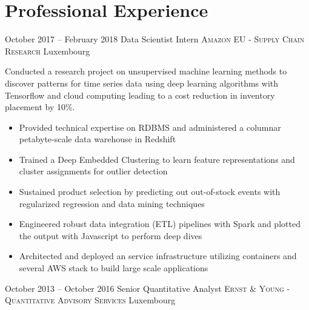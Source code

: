 \documentclass[11pt,a4paper,sans]{moderncv}
\begin{document}
\section{\LARGE{Professional Experience}}
\vspace{2mm}
\cventry
	{October 2017 -- February 2018}
	{Data Scientist Intern}
	{\textsc{Amazon EU - Supply Chain Research}}
	{Luxembourg}{}
	{
	Conducted a research project on unsupervised machine learning methods to discover patterns for time series data using deep learning algorithms with Tensorflow and cloud computing leading to a cost reduction in inventory placement by 10\%. 
	\vspace{1mm}
	\begin{itemize}
		\item Provided technical expertise on RDBMS and administered a columnar petabyte-scale data warehouse in Redshift
		\item Trained a Deep Embedded Clustering to learn feature representations and cluster assignments for outlier detection
		\item Sustained product selection by predicting out out-of-stock events with  regularized regression and data mining techniques
		\item Engineered robust data integration (ETL) pipelines with Spark and plotted the output with Javascript to perform deep dives
		\item Architected and deployed an service infrastructure utilizing containers and several AWS stack to build large scale applications
		\vspace{2mm}
	\end{itemize}
	} 
\cventry
	{October 2013 -- October 2016}
	{Senior Quantitative Analyst}
	{\textsc{Ernst \& Young - Quantitative Advisory Services}}
	{Luxembourg}{}
\end{document}
